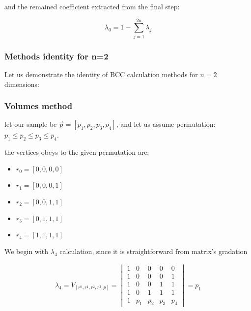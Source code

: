 \begin{}
		and the remained coefficient extracted from the final step:
		
		\begin{equation}
		\lambda_0 = 1 - \sum_{j=1}^{2n} \lambda_j
		\end{equation}		
		
		
		
		\subsubsection{Methods identity for n=2}
		
		Let us demonstrate the identity of BCC calculation methods for $n=2$ dimensions:
			
		
		\subsubsection{Volumes method}
		
		let our sample be $\overrightarrow{p}=[p_1,p_2,p_3,p_4]$, and let us assume permutation: \\ 
		$p_1 \leq p_2 \leq p_3\leq p_4$.

		the vertices obeys to the given permutation are:
		
		\begin{itemize}
		\item $r_0 = [0,0,0,0]$
		\item $r_1 = [0,0,0,1]$
		\item $r_2 = [0,0,1,1]$
		\item $r_3 = [0,1,1,1]$
		\item $r_4 = [1,1,1,1]$
		\end{itemize}
		
		We begin with $\lambda_4$ calculation, since it is straightforward from matrix’s gradation
		
		
		\begin{equation}
		\begin{align*}
			\lambda_4 = V_{[r^0,r^1,r^2,r^3,p]} = 
			\begin{vmatrix}
				1 & 0 & 0 & 0 & 0\\ 
				1 & 0 & 0 & 0 & 1\\ 
				1 &  0  & 0 & 1 & 1 \\ 
				1 & 0 & 1 & 1 & 1\\ 
				1 & p_{1} &  p_{2}& p_{3} & p_{4}
				\end{vmatrix} = p_1				
		\end{align*}		
		\end{equation}
		

\end{}
